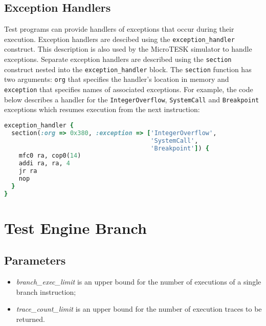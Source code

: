 \documentclass[oneside,final,12pt]{extreport}
\begin{document}

\section{Exception Handlers}

Test programs can provide handlers of exceptions that occur during their execution.
Exception handlers are descibed using the {\tt exception{\_}handler} construct.
This description is also used by the MicroTESK simulator to handle exceptions.
Separate exception handlers are described using the {\tt section} construct nested into
the {\tt exception{\_}handler} block. The {\tt section} function has two arguments: {\tt org}
that specifies the handler's location in memory and {\tt exception} that specifies names of
associated exceptions. For example, the code below describes a handler for
the {\tt IntegerOverflow}, {\tt SystemCall} and {\tt Breakpoint} exceptions which resumes
execution from the next instruction:

\begin{lstlisting}[language=ruby, emph={exception_handler, section}]
exception_handler {
  section(:org => 0x380, :exception => ['IntegerOverflow',
                                        'SystemCall',
                                        'Breakpoint']) {
    mfc0 ra, cop0(14)
    addi ra, ra, 4
    jr ra 
    nop
  }
}
\end{lstlisting}


\chapter{Test Engine Branch}

\section{Parameters}

\begin{itemize}
\item \emph{branch{\_}exec{\_}limit} is an upper bound for the number of executions of a single branch instruction;
\item \emph{trace{\_}count{\_}limit} is an upper bound for the number of execution traces to be returned.
\end{itemize}
\end{document}
